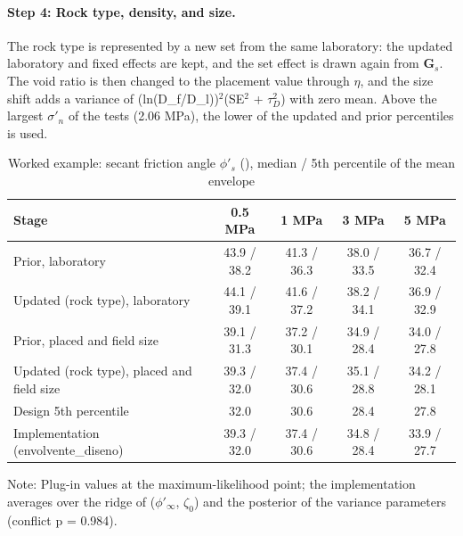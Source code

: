 \documentclass[Journal,letterpaper,InsideFigs,NoLists,NoLineNumbers]{ascelike-new}
\begin{document}
\paragraph{Step 4: Rock type, density, and size.}
The rock type is represented by a new set from the same laboratory: the updated laboratory and fixed effects are kept, and the set effect is drawn again from $\mathbf{G}_s$. The void ratio is then changed to the placement value through $\eta$, and the size shift adds a variance of (ln(D\_f/D\_l))$^{2}$(SE$^{2}$ + $\tau_D^{2}$) with zero mean. Above the largest $\sigma'_n$ of the tests (2.06 MPa), the lower of the updated and prior percentiles is used.
\begin{table}[htbp]
\caption{Worked example: secant friction angle $\phi'_s$ (\textdegree{}), median / 5th percentile of the mean envelope}
\centering\footnotesize
\renewcommand{\arraystretch}{1.2}
\setlength{\tabcolsep}{3.5pt}
\begin{tabular}{lcccc}
\hline
Stage & 0.5 MPa & 1 MPa & 3 MPa & 5 MPa \\
\hline
Prior, laboratory & 43.9 / 38.2 & 41.3 / 36.3 & 38.0 / 33.5 & 36.7 / 32.4 \\
Updated (rock type), laboratory & 44.1 / 39.1 & 41.6 / 37.2 & 38.2 / 34.1 & 36.9 / 32.9 \\
Prior, placed and field size & 39.1 / 31.3 & 37.2 / 30.1 & 34.9 / 28.4 & 34.0 / 27.8 \\
Updated (rock type), placed and field size & 39.3 / 32.0 & 37.4 / 30.6 & 35.1 / 28.8 & 34.2 / 28.1 \\
Design 5th percentile & 32.0 & 30.6 & 28.4 & 27.8 \\
Implementation (envolvente\_diseno) & 39.3 / 32.0 & 37.4 / 30.6 & 34.8 / 28.4 & 33.9 / 27.7 \\
\hline
\end{tabular}
\par\vspace{4pt}\parbox{\linewidth}{\footnotesize Note: Plug-in values at the maximum-likelihood point; the implementation averages over the ridge of ($\phi'_\infty$, $\zeta_0$) and the posterior of the variance parameters (conflict p = 0.984).}
\end{table}
\end{document}
